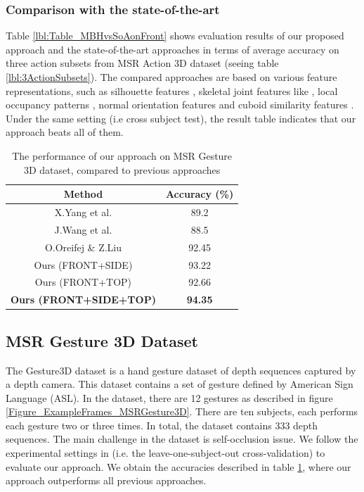 \documentclass[final,3p,times,twocolumn]{elsarticle}
\begin{document}
\subsubsection{Comparison with the state-of-the-art}
Table \ref{lbl:Table_MBHvsSoAonFront} shows evaluation results of our proposed approach and the state-of-the-art approaches in terms of average accuracy on three action subsets from MSR Action 3D dataset (seeing table \ref{lbl:3ActionSubsets}).
The compared approaches are based on various feature representations, such as silhouette features \cite{li2010action, yang2012recognizing}, skeletal joint features like \cite{yang2012eigenjoints, wang2012mining}, local occupancy patterns \cite{wang2012robust, vieira2012stop}, normal orientation features \cite{oreifej2013hon4d} and cuboid similarity features \cite{xia2013spatio}.
Under the same setting (i.e cross subject test), the result table indicates that our approach beats all of them.

\begin{table}[H]
	\begin{tabular}{c|c}	
		    \bf Method & \bf Accuracy (\%) \\
		\hline
		X.Yang et al. \cite{yang2012recognizing}&       89.2 \\
		
		J.Wang et al. \cite{wang2012robust}&       88.5 \\
		
		O.Oreifej \& Z.Liu \cite{oreifej2013hon4d}&      92.45 \\
		\hline
		Ours (FRONT+SIDE) &      93.22 \\
		
		Ours (FRONT+TOP) &      92.66 \\
		
		\bf Ours (FRONT+SIDE+TOP) &      \bf 94.35 \\
	
	\end{tabular}  
	
	\caption{The performance of our approach on MSR Gesture 3D dataset, compared to previous approaches}
	\label{Table_MSRGesture3D_SoA}
\end{table}

\subsection{MSR Gesture 3D Dataset}

The Gesture3D dataset \cite{wang2012robust} is a hand gesture dataset of depth sequences captured by a depth camera.
This dataset contains a set of gesture defined by American Sign Language (ASL).
In the dataset, there are 12 gestures as described in figure \ref{Figure_ExampleFrames_MSRGesture3D}.
There are ten subjects, each performs each gesture two or three times.
In total, the dataset contains 333 depth sequences.
The main challenge in the dataset is self-occlusion issue.
We follow the experimental settings in \cite{wang2012robust} (i.e. the leave-one-subject-out cross-validation) to evaluate our approach.
We obtain the accuracies described in table \ref{Table_MSRGesture3D_SoA}, where our approach outperforms all previous approaches.
\end{document}
